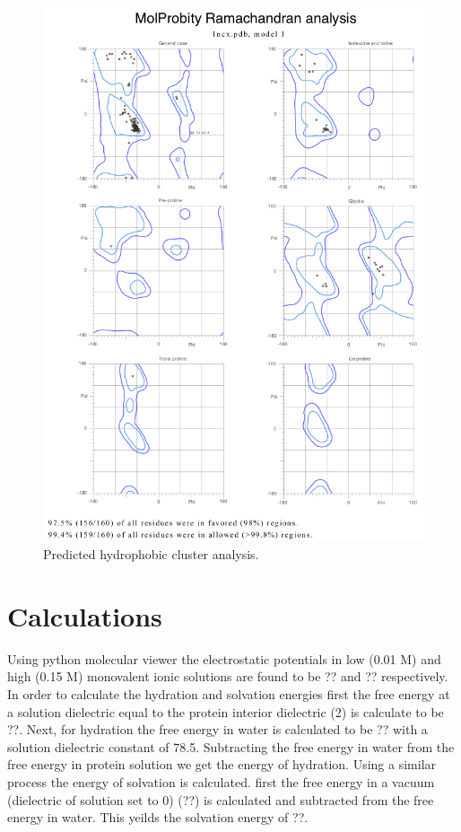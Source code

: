 \documentclass[12pt]{article}
\begin{document}
\begin{figure}[h]
	\centering
	\includegraphics[width=.95\linewidth]{ramachandran.png}
	
	\caption{Predicted hydrophobic cluster analysis.}
	\label{ramchan}
\end{figure}
\section{Calculations}

Using python molecular viewer the electrostatic potentials in low (0.01 M) and high (0.15 M) monovalent ionic solutions are found to be ?? and ?? respectively. In order to calculate the hydration and solvation energies first the free energy at a solution dielectric equal to the protein interior dielectric (2) is calculate to be ??. Next, for hydration the free energy in water is calculated to be ?? with a solution dielectric constant of 78.5. Subtracting the free energy in water from the free energy in protein solution we get the energy of hydration. Using a similar process the energy of solvation is calculated. first the free energy in a vacuum (dielectric of solution set to 0) (??) is calculated and subtracted from the free energy in water. This yeilds the solvation energy of ??.
\end{document}
